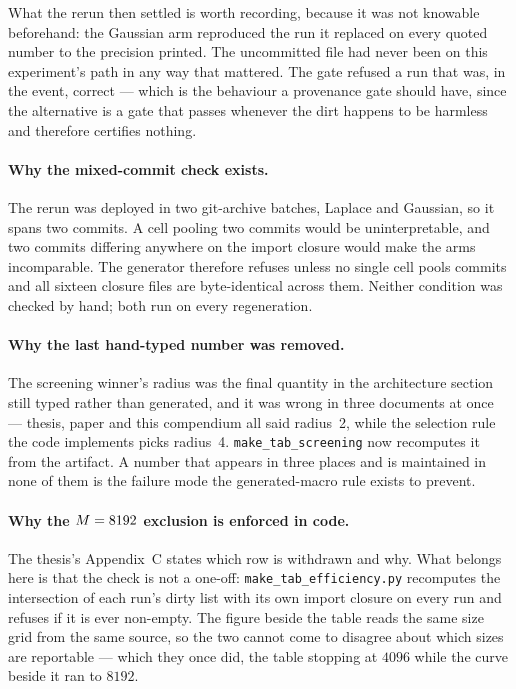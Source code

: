 What the rerun then settled is worth recording, because it was not knowable
beforehand: the Gaussian arm reproduced the run it replaced on every quoted
number to the precision printed. The uncommitted file had never been on this
experiment's path in any way that mattered. The gate refused a run that was, in
the event, correct --- which is the behaviour a provenance gate should have,
since the alternative is a gate that passes whenever the dirt happens to be
harmless and therefore certifies nothing.

\paragraph{Why the mixed-commit check exists.} The rerun was deployed in two
git-archive batches, Laplace and Gaussian, so it spans two commits. A cell
pooling two commits would be uninterpretable, and two commits differing anywhere
on the import closure would make the arms incomparable. The generator therefore
refuses unless no single cell pools commits and all sixteen closure files are
byte-identical across them. Neither condition was checked by hand; both run on
every regeneration.

\paragraph{Why the last hand-typed number was removed.} The screening winner's
radius was the final quantity in the architecture section still typed rather
than generated, and it was wrong in three documents at once --- thesis, paper
and this compendium all said radius~2, while the selection rule the code
implements picks radius~4. \texttt{make\_tab\_screening} now recomputes it from
the artifact. A number that appears in three places and is maintained in none of
them is the failure mode the generated-macro rule exists to prevent.

\paragraph{Why the $M = 8192$ exclusion is enforced in code.} The thesis's
Appendix~C states which row is withdrawn and why. What belongs here is that the
check is not a one-off: \texttt{make\_tab\_efficiency.py} recomputes the
intersection of each run's dirty list with its own import closure on every run
and refuses if it is ever non-empty. The figure beside the table reads the same
size grid from the same source, so the two cannot come to disagree about which
sizes are reportable --- which they once did, the table stopping at $4096$ while
the curve beside it ran to $8192$.
